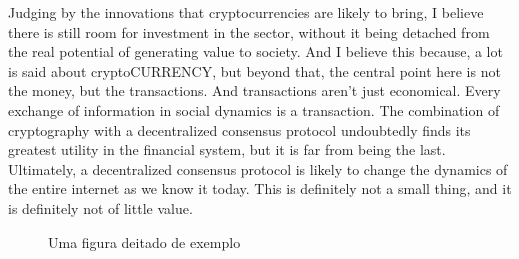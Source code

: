 Judging by the innovations that cryptocurrencies are likely to bring, I believe there is still room for investment in the sector, without it being detached from the real potential of generating value to society. And I believe this because, a lot is said about cryptoCURRENCY, but beyond that, the central point here is not the money, but the transactions. And transactions aren't just economical. Every exchange of information in social dynamics is a transaction. The combination of cryptography with a decentralized consensus protocol undoubtedly finds its greatest utility in the financial system, but it is far from being the last. Ultimately, a decentralized consensus protocol is likely to change the dynamics of the entire internet as we know it today. This is definitely not a small thing, and it is definitely not of little value.

\begin{landscape}
  \begin{figure}[!hbt]
    \centering
    \caption{Uma figura deitado de exemplo}
    \label{figura-exemplo2}
  \end{figure}
\end{landscape}

